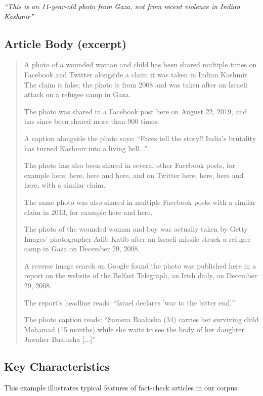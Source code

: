 \documentclass[10pt]{article}
\begin{document}
\textit{``This is an 11-year-old photo from Gaza, not from recent violence in Indian Kashmir''}

\subsection{Article Body (excerpt)}

\begin{quote}
\small
A photo of a wounded woman and child has been shared multiple times on Facebook and Twitter alongside a claim it was taken in Indian Kashmir. The claim is false; the photo is from 2008 and was taken after an Israeli attack on a refugee camp in Gaza.

The photo was shared in a Facebook post here on August 22, 2019, and has since been shared more than 900 times.

A caption alongside the photo says: ``Faces tell the story!! India's brutality has turned Kashmir into a living hell...''

The photo has also been shared in several other Facebook posts, for example here, here, here and here, and on Twitter here, here, here and here, with a similar claim.

The same photo was also shared in multiple Facebook posts with a similar claim in 2013, for example here and here.

The photo of the wounded woman and boy was actually taken by Getty Images' photographer Adib Katib after an Israeli missile struck a refugee camp in Gaza on December 29, 2008.

A reverse image search on Google found the photo was published here in a report on the website of the Belfast Telegraph, an Irish daily, on December 29, 2008.

The report's headline reads: ``Israel declares 'war to the bitter end'.''

The photo caption reads: ``Samera Baalusha (34) carries her surviving child Mohamad (15 months) while she waits to see the body of her daughter Jawaher Baalusha [...]''
\end{quote}

\subsection{Key Characteristics}

This example illustrates typical features of fact-check articles in our corpus:
\end{document}
